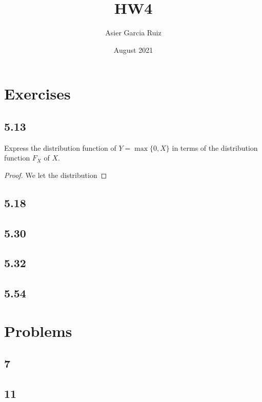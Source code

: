 \documentclass{article}
\title{HW4}
\author{Asier Garcia Ruiz }
\date{August 2021}
\begin{document}
\maketitle

\section*{Exercises}
\subsection*{5.13}
Express the distribution function of $Y=\max\{0,X\}$ in terms of the distribution
function $F_X$ of $X$.

\begin{proof}
    We let the distribution 
\end{proof}

\subsection*{5.18}

\subsection*{5.30}

\subsection*{5.32}

\subsection*{5.54}

\section*{Problems}
\subsection*{7}

\subsection*{11}
\end{document}
